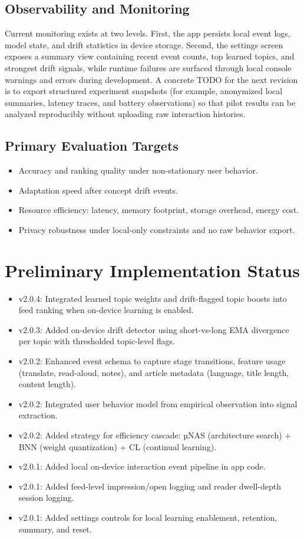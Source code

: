 \documentclass[11pt]{article}
\begin{document}
\subsection{Observability and Monitoring}
Current monitoring exists at two levels. First, the app persists local event logs, model state, and drift statistics in device storage. Second, the settings screen exposes a summary view containing recent event counts, top learned topics, and strongest drift signals, while runtime failures are surfaced through local console warnings and errors during development. A concrete TODO for the next revision is to export structured experiment snapshots (for example, anonymized local summaries, latency traces, and battery observations) so that pilot results can be analyzed reproducibly without uploading raw interaction histories.

\subsection{Primary Evaluation Targets}
\begin{itemize}[leftmargin=*]
\item Accuracy and ranking quality under non-stationary user behavior.
\item Adaptation speed after concept drift events.
\item Resource efficiency: latency, memory footprint, storage overhead, energy cost.
\item Privacy robustness under local-only constraints and no raw behavior export.
\end{itemize}

\section{Preliminary Implementation Status}
\begin{itemize}[leftmargin=*]
\item v2.0.4: Integrated learned topic weights and drift-flagged topic boosts into feed ranking when on-device learning is enabled.
\item v2.0.3: Added on-device drift detector using short-vs-long EMA divergence per topic with thresholded topic-level flags.
\item v2.0.2: Enhanced event schema to capture stage transitions, feature usage (translate, read-aloud, notes), and article metadata (language, title length, content length).
\item v2.0.2: Integrated user behavior model from empirical observation into signal extraction.
\item v2.0.2: Added strategy for efficiency cascade: µNAS (architecture search) + BNN (weight quantization) + CL (continual learning).
\item v2.0.1: Added local on-device interaction event pipeline in app code.
\item v2.0.1: Added feed-level impression/open logging and reader dwell-depth session logging.
\item v2.0.1: Added settings controls for local learning enablement, retention, summary, and reset.
\end{itemize}
\end{document}
